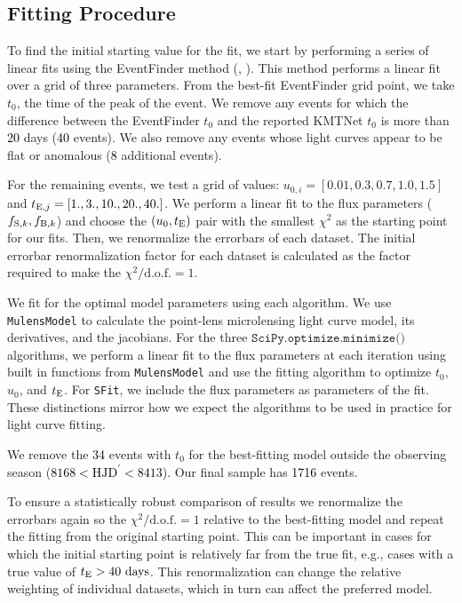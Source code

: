 \documentclass[preprint]{aastex631}
\newcommand{\num}[1]{\textcolor{black}{#1}}
\newcommand{\minimize}{$\texttt{SciPy.optimize.minimize()}$}
\newcommand{\sfit}{\texttt{SFit}}
\begin{document}
\subsection{Fitting Procedure}

To find the initial starting value for the fit, we start by performing a series of linear fits using the EventFinder method (\citealt{KimKim18_EF}, \citealt{Kim18EF}). This method performs a linear fit over a grid of three parameters. From the best-fit EventFinder grid point, we take $t_0$, the time of the peak of the event. We remove any events for which the difference between the EventFinder $t_0$ and the reported KMTNet $t_0$ is more than \num{20} days (\num{40} events). We also remove any events whose light curves appear to be flat or anomalous (\num{8} additional events).

For the remaining events, we test a grid of values: $u_{0, i} = [0.01, 0.3, 0.7, 1.0, 1.5]$ and $t_{{\rm E}, j}=[1., 3., 10., 20., 40.]$. We perform a linear fit to the flux parameters  ($f_{{\rm S}, k}, f_{{\rm B}, k}$) and choose the $(u_0, t_{\rm E})$ pair with the smallest $\chi^2$ as the starting point for our fits.  Then, we renormalize the errorbars of each dataset. The initial errorbar renormalization factor for each dataset is calculated as the factor required to make the $\chi^2/\mathrm{d.o.f.} = 1$.

We fit for the optimal model parameters using each algorithm. We use \texttt{MulensModel} \citep{MulensModel} to calculate the point-lens microlensing light curve model, its derivatives, and the jacobians.  For the three \minimize\, algorithms, we perform a linear fit to the flux parameters at each iteration using built in functions from \texttt{MulensModel} and use the fitting algorithm to optimize $t_0$, $u_0$, and $t_{\rm E}$. For \sfit, we include the flux parameters as parameters of the fit. These distinctions mirror how we expect the algorithms to be used in practice for light curve fitting.

We remove the \num{34} events with $t_0$ for the best-fitting model outside the observing season (\num{$8168 < \mathrm{HJD}^\prime < 8413$}). Our final sample has \num{1716} events.

To ensure a statistically robust comparison of results we renormalize the errorbars again so the $\chi^2/\mathrm{d.o.f.} = 1$ relative to the best-fitting model and repeat the fitting from the original starting point. This can be important in cases for which the initial starting point is relatively far from the true fit, e.g., cases with a true value of $t_{\rm E} > 40~\mathrm{days}$. This renormalization can change the relative weighting of individual datasets, which in turn can affect the preferred model.
\end{document}
